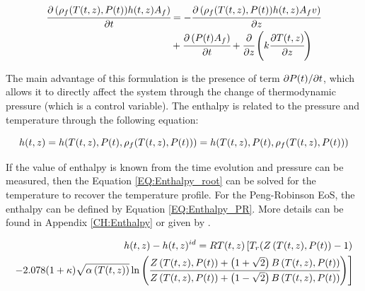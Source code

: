 \documentclass[../Article_Model_Parameters.tex]{subfiles}
\begin{document}
			{\footnotesize
				\begin{align} \label{EQ:Enthalpy_equation}
					\cfrac{\partial \left({\color{black}\rho_f}({\color{black}T}(t,z),{\color{black}P}(t)) {\color{black}h}(t,z) A_f\right)}{\partial t} &= - \cfrac{\partial \left( {\color{black}\rho_f}({\color{black}T}(t,z),{\color{black}P}(t)) {\color{black}h}(t,z) A_f v \right)}{\partial {\color{black}z}}  \nonumber \\
					& + \cfrac{\partial \left({\color{black}P}(t) A_f\right)}{\partial t} + \cfrac{\partial}{\partial {\color{black}z}} \left( k \cfrac{\partial {\color{black}T}(t,z)}{\partial {\color{black}z}} \right)
				\end{align}
			}
		
			The main advantage of this formulation is the presence of term $\partial {\color{black}P}(t) / \partial t $, which allows it to directly affect the system through the change of thermodynamic pressure (which is a control variable). The enthalpy is related to the pressure and temperature through the following equation:
			
			{\footnotesize
				\begin{equation}
					{\color{black}h}(t,z)={\color{black}h}({\color{black}T}(t,z),{\color{black}P}(t),{\color{black}\rho_f}({\color{black}T}(t,z),{\color{black}P}(t)))={\color{black}h}( {\color{black}T}(t,z),{\color{black}P}(t), {\color{black}\rho_f}({\color{black}T}(t,z),{\color{black}P}(t)) ) 
					\label{EQ:Enthalpy_root}
				\end{equation}
			}
		
			If the value of enthalpy is known from the time evolution and pressure can be measured, then the Equation \ref{EQ:Enthalpy_root} can be solved for the temperature to recover the temperature profile. For the Peng-Robinson EoS, the enthalpy can be defined by Equation \ref{EQ:Enthalpy_PR}. More details can be found in Appendix \ref{CH:Enthalpy} or given by \citet{Gmehling2019}.
			
			{\scriptsize
				\begin{equation}
					\begin{split}
					{\color{black}h}(t,z)-{\color{black}h}(t,z)^{id}={\color{black}R}{\color{black}T}(t,z) \left[{\color{black}T_r}({\color{black}Z}\left({\color{black}T}(t,z), {\color{black}P}(t)\right)-1) \right. \\
					\left. -2.078(1+{\color{black}\kappa} ){\sqrt { {\color{black}\alpha}\left({\color{black}T}(t,z)\right) } } \ln \left(\cfrac{{\color{black}Z}\left({\color{black}T}(t,z), {\color{black}P}(t)\right)+\left( 1+\sqrt{2} \right){\color{black}B}\left({\color{black}T}(t,z), {\color{black}P}(t)\right)}{{\color{black}Z}\left({\color{black}T}(t,z), {\color{black}P}(t)\right)+\left( 1-\sqrt{2} \right){\color{black}B}\left({\color{black}T}(t,z), {\color{black}P}(t)\right)}\right)\right]
					\label{EQ:Enthalpy_PR}
				\end{split}
			\end{equation}				
			}
		
\end{document}
